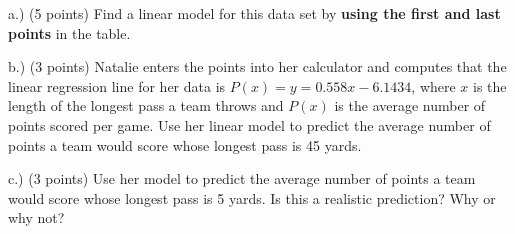 \documentclass[11pt]{article}
\begin{document}
\begin{questions}
a.) (5 points) Find a linear model for this data set by \textbf{using the first and last points} in the table.
\vspace{2.00in}


b.) (3 points) Natalie enters the points into her calculator and computes that the linear regression line for her data is $P(x) = y = 0.558x - 6.1434$, where $x$ is the length of the longest pass a team throws and $P(x)$ is the average number of points scored per game.  Use her linear model to predict the average number of points a team would score whose longest pass is 45 yards.
\vspace{1.25in}

c.) (3 points) Use her model to predict the average number of points a team would score whose longest pass is 5 yards.  Is this a realistic prediction?  Why or why not?





\mbox{}
\end{questions}
\end{document}
